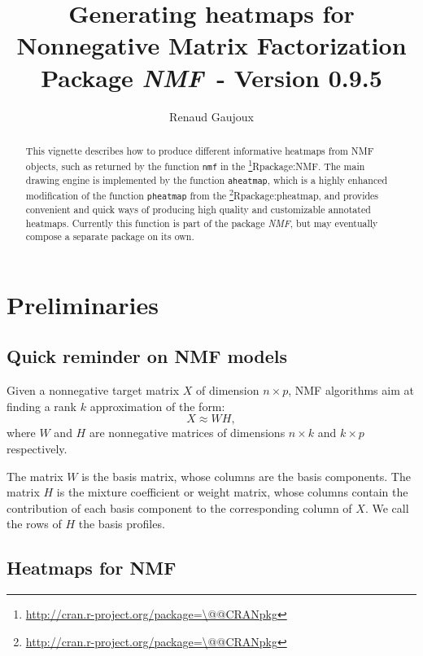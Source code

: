\documentclass[a4paper]{article}\usepackage{graphicx, color}
\makeatletter
\let\code=\texttt
\newcommand{\pkgname}[1]{\textit{#1}\xspace}
\newcommand{\CRANurl}[1]{\url{http://cran.r-project.org/package=#1}}
\def\CRANpkg{\@ifstar\@CRANpkg\@@CRANpkg}
\def\@CRANpkg#1{\href{http://cran.r-project.org/package=#1}{\pkgname{#1}}\footnote{\CRANurl{#1}}}
\def\@@CRANpkg#1{\href{http://cran.r-project.org/package=#1}{\pkgname{#1}} package\footnote{\CRANurl{#1}}}
\def\citeCRANpkg{\@ifstar\@citeCRANpkg\@@citeCRANpkg}
\def\@citeCRANpkg#1{\CRANpkg{#1}\cite*{Rpackage:#1}}
\def\@@citeCRANpkg#1{\CRANpkg{#1}~\cite{Rpackage:#1}}
\newcommand{\nmfpack}{\pkgname{NMF}}
\renewcommand{\cite}[1]{\parencite{#1}}
\makeatother
\begin{document}
\title{Generating heatmaps for Nonnegative Matrix Factorization\\
\small Package \nmfpack\ - Version 0.9.5}
\author{Renaud Gaujoux}

\maketitle

\begin{abstract}
This vignette describes how to produce different informative heatmaps from NMF objects, 
such as returned by the function \code{nmf} in the \citeCRANpkg{NMF}.
The main drawing engine is implemented by the function \code{aheatmap}, which is 
a highly enhanced modification of the function \code{pheatmap} from the \citeCRANpkg{pheatmap},
and provides convenient and quick ways of producing high quality and customizable annotated heatmaps.
Currently this function is part of the package \nmfpack, but may eventually 
compose a separate package on its own.
\end{abstract}

{\small \tableofcontents}

\section{Preliminaries}

\subsection{Quick reminder on NMF models}

Given a nonnegative target matrix $X$ of dimension $n\times p$, NMF algorithms 
aim at finding a rank $k$ approximation of the form:
$$
X \approx W H,
$$
where $W$ and $H$ are nonnegative matrices of dimensions $n\times k$ and $k\times p$ 
respectively.

The matrix $W$ is the basis matrix, whose columns are the basis components.
The matrix $H$ is the mixture coefficient or weight matrix, whose columns contain 
the contribution of each basis component to the corresponding column of $X$.
We call the rows of $H$ the basis profiles.

\subsection{Heatmaps for NMF}
\end{document}
